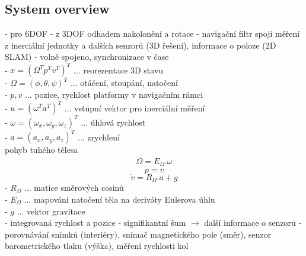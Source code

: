 \documentclass[11pt]{article}
\begin{document}
\subsection{System overview}
- pro 6DOF - z 3DOF odhadem nakolonění a rotace - navigační filtr spojí měření z inerciální jednotky a dalších senzorů (3D řešení), informace o poloze (2D SLAM) - volně spojeno, synchronizace v čase\\
- $x=(\Omega^T p^T v^T)^T$ ... reorezentace 3D stavu\\
- $\Omega=(\phi,\theta,\psi)^T$ ... otáčení, stoupání, natočení\\
- $p,v$ ... pozice, rychlost platformy v navigačním rámci\\
- $u=(\omega^T a^T)^T$ ... vstupní vektor pro inerciální měření\\
- $\omega=(\omega_x,\omega_y,\omega_z)^T$ ... úhlová rychlost\\
- $a=(a_x,a_y,a_z)^T$ ... zrychlení\\
pohyb tuhého tělesa
$$\dot{\Omega}=E_\Omega.\omega$$
$$\dot{p}=v$$
$$\dot{v}=R_\Omega.a+g$$
- $R_\Omega$ ... matice směrových cosinů\\
- $E_\Omega$ ... mapování natočení těla na deriváty Eulerova úhlu\\
- $g$ ... vektor gravitace\\
- integrovaná rychlost a pozice - signifikantní šum $\rightarrow$ další informace o senzoru - porovnávání snímků (interiéry), snímač magnetického pole (směr), senzor barometrického tlaku (výška), měření rychlosti kol\\
\end{document}
